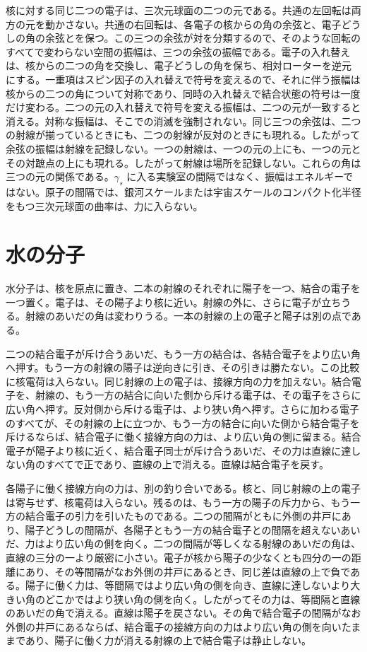 \documentclass[a4paper]{article}
\begin{document}
核に対する同じ二つの電子は、三次元球面の二つの元である。共通の左回転は両方の元を動かさない。共通の右回転は、各電子の核からの角の余弦と、電子どうしの角の余弦とを保つ。この三つの余弦が対を分類するので、そのような回転のすべてで変わらない空間の振幅は、三つの余弦の振幅である。電子の入れ替えは、核からの二つの角を交換し、電子どうしの角を保ち、相対ローターを逆元にする。一重項はスピン因子の入れ替えで符号を変えるので、それに伴う振幅は核からの二つの角について対称であり、同時の入れ替えで結合状態の符号は一度だけ変わる。二つの元の入れ替えで符号を変える振幅は、二つの元が一致すると消える。対称な振幅は、そこでの消滅を強制されない。同じ三つの余弦は、二つの射線が揃っているときにも、二つの射線が反対のときにも現れる。したがって余弦の振幅は射線を記録しない。一つの射線は、一つの元の上にも、一つの元とその対蹠点の上にも現れる。したがって射線は場所を記録しない。これらの角は三つの元の関係である。\(\gamma_s\) に入る実験室の間隔ではなく、振幅はエネルギーではない。原子の間隔では、銀河スケールまたは宇宙スケールのコンパクト化半径をもつ三次元球面の曲率は、力に入らない。

\section{水の分子}
\label{sec:water}

水分子は、核を原点に置き、二本の射線のそれぞれに陽子を一つ、結合の電子を一つ置く。電子は、その陽子より核に近い。射線の外に、さらに電子が立ちうる。射線のあいだの角は変わりうる。一本の射線の上の電子と陽子は別の点である。

二つの結合電子が斥け合うあいだ、もう一方の結合は、各結合電子をより広い角へ押す。もう一方の射線の陽子は逆向きに引き、その引きは勝たない。この比較に核電荷は入らない。同じ射線の上の電子は、接線方向の力を加えない。結合電子を、射線の、もう一方の結合に向いた側から斥ける電子は、その電子をさらに広い角へ押す。反対側から斥ける電子は、より狭い角へ押す。さらに加わる電子のすべてが、その射線の上に立つか、もう一方の結合に向いた側から結合電子を斥けるならば、結合電子に働く接線方向の力は、より広い角の側に留まる。結合電子が陽子より核に近く、結合電子同士が斥け合うあいだ、その力は直線に達しない角のすべてで正であり、直線の上で消える。直線は結合電子を戻す。

各陽子に働く接線方向の力は、別の釣り合いである。核と、同じ射線の上の電子は寄与せず、核電荷は入らない。残るのは、もう一方の陽子の斥力から、もう一方の結合電子の引力を引いたものである。二つの間隔がともに外側の井戸にあり、陽子どうしの間隔が、各陽子ともう一方の結合電子との間隔を超えないあいだ、力はより広い角の側を向く。二つの間隔が等しくなる射線のあいだの角は、直線の三分の一より厳密に小さい。電子が核から陽子の少なくとも四分の一の距離にあり、その等間隔がなお外側の井戸にあるとき、同じ差は直線の上で負である。陽子に働く力は、等間隔ではより広い角の側を向き、直線に達しないより大きい角のどこかではより狭い角の側を向く。したがってその力は、等間隔と直線のあいだの角で消える。直線は陽子を戻さない。その角で結合電子の間隔がなお外側の井戸にあるならば、結合電子の接線方向の力はより広い角の側を向いたままであり、陽子に働く力が消える射線の上で結合電子は静止しない。
\end{document}
